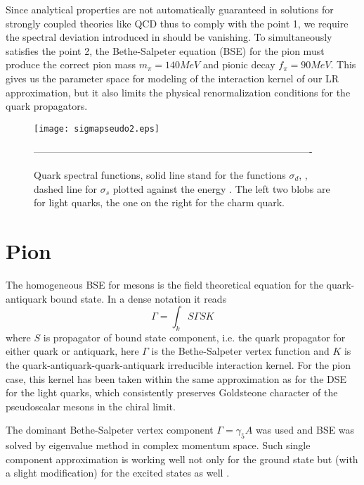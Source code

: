 \documentclass[aps,prd,superscriptaddress,eqsecnum,amsfonts,showpacs,epsfig]{revtex4}
\newcommand{\be}{\begin{equation}}
\newcommand{\ee}{\end{equation}}
\begin{document}
Since analytical properties are  not automatically guaranteed in solutions for strongly coupled theories like QCD
thus to comply with the point 1, we require the spectral deviation  introduced in \cite{s1,s2} should  be vanishing.
  To  simultaneously  satisfies the point 2, the Bethe-Salpeter equation (BSE) for the pion  must produce the correct pion mass   
 $m_{\pi}=140 MeV$ and pionic decay $f_{\pi}=90 MeV$. 
This gives us   the parameter space for modeling of the interaction kernel of our LR approximation, but it also limits the physical  renormalization 
 conditions for the quark propagators. 


%
 \begin{figure}
\centerline{\texttt{[image: sigmapseudo2.eps]}}
\caption{Quark spectral functions, solid line stand for the functions $\sigma_d$, , dashed line for $\sigma_s$ plotted against the energy . The left two blobs are for light quarks, the one on the right for the charm quark.}
\label{jedna}
{\mbox{-------------------------------------------------------------------------------------}}
\end{figure}
 


\section{Pion }

The homogeneous BSE for mesons is the field theoretical equation for the quark-antiquark bound state. In a dense notation it reads
\be
\Gamma=\int_k S\Gamma S K
\ee
where $S$ is  propagator of bound state component, i.e. the quark propagator  for either  quark or antiquark, here $\Gamma$
is the Bethe-Salpeter vertex function and $K$ is the quark-antiquark-quark-antiquark irreducible interaction kernel.
For the pion case, this kernel has been taken within the same  approximation as for  the DSE for the 
light quarks, which consistently preserves Goldsteone character of the pseudoscalar mesons in the chiral limit.



 
The dominant Bethe-Salpeter vertex component $\Gamma =\gamma_5 A$
 was used and BSE was solved by eigenvalue method in complex momentum space. 
Such single component approximation is working well 
not only for the ground state \cite{FNW2008} but (with a slight modification) for the excited states as well \cite{saulipsy}. 
\end{document}

